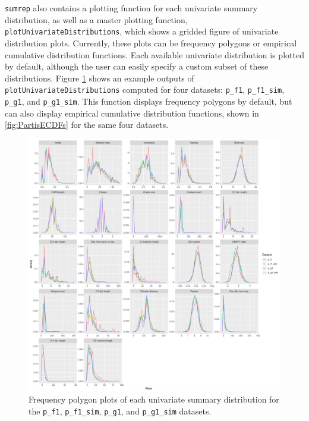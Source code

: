 \documentclass{article}
\begin{document}
\texttt{sumrep} also contains a plotting function for each univariate summary distribution, as well as a master plotting function, \texttt{plotUnivariateDistributions}, which shows a gridded figure of univariate distribution plots.
Currently, these plots can be frequency polygons or empirical cumulative distribution functions.
Each available univariate distribution is plotted by default, although the user can easily specify a custom subset of these distributions.
Figure \ref{fig:PartisFreqPolys} shows an example outputs of \texttt{plotUnivariateDistributions} computed for four datasets: \texttt{p\_f1}, \texttt{p\_f1\_sim}, \texttt{p\_g1}, and \texttt{p\_g1\_sim}.
This function displays frequency polygons by default, but can also display empirical cumulative distribution functions, shown in \ref{fig:PartisECDFs} for the same four datasets.
\begin{figure}
    \includegraphics[width=\linewidth]{Figures/partis_freqpoly.pdf}
    \caption{Frequency polygon plots of each univariate summary distribution for the \texttt{p\_f1}, \texttt{p\_f1\_sim}, \texttt{p\_g1}, and \texttt{p\_g1\_sim} datasets.}
    \label{fig:PartisFreqPolys}
\end{figure}
\end{document}
